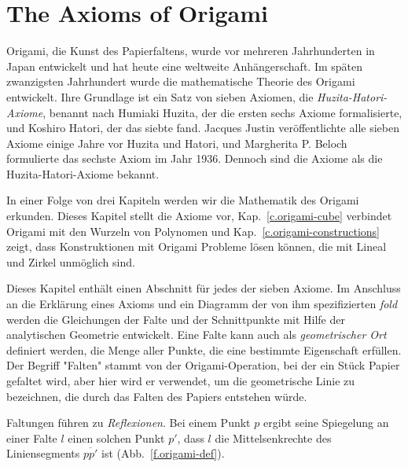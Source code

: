
\chapter{The Axioms of Origami}\label{c.origami-axioms}


Origami, die Kunst des Papierfaltens, wurde vor mehreren Jahrhunderten in Japan entwickelt und hat heute eine weltweite Anhängerschaft. Im späten zwanzigsten Jahrhundert wurde die mathematische Theorie des Origami entwickelt. Ihre Grundlage ist ein Satz von sieben Axiomen, die 
\emph{Huzita-Hatori-Axiome}, benannt nach Humiaki Huzita, der die ersten sechs Axiome formalisierte, und Koshiro Hatori, der das siebte fand. Jacques Justin veröffentlichte alle sieben Axiome einige Jahre vor Huzita und Hatori, und Margherita P. Beloch formulierte das sechste Axiom im Jahr 1936. Dennoch sind die Axiome als die Huzita-Hatori-Axiome bekannt.

In einer Folge von drei Kapiteln werden wir die Mathematik des Origami erkunden. Dieses Kapitel stellt die Axiome vor, Kap.~\ref{c.origami-cube} verbindet Origami mit den Wurzeln von Polynomen und Kap.~\ref{c.origami-constructions} zeigt, dass Konstruktionen mit Origami Probleme lösen können, die mit Lineal und Zirkel unmöglich sind.
 
Dieses Kapitel enthält einen Abschnitt für jedes der sieben Axiome. Im Anschluss an die Erklärung eines Axioms und ein Diagramm der von ihm spezifizierten \emph{fold} werden die Gleichungen der Falte und der Schnittpunkte mit Hilfe der analytischen Geometrie entwickelt. Eine Falte kann auch als \emph{geometrischer Ort} definiert werden, die Menge aller Punkte, die eine bestimmte Eigenschaft erfüllen. Der Begriff "Falten" stammt von der Origami-Operation, bei der ein Stück Papier gefaltet wird, aber hier wird er verwendet, um die geometrische Linie zu bezeichnen, die durch das Falten des Papiers entstehen würde.

Faltungen führen zu \emph{Reflexionen}. Bei einem Punkt $p$ ergibt seine Spiegelung an einer Falte $l$ einen solchen Punkt $p'$, dass $l$ die Mittelsenkrechte des Liniensegments $\overline{pp'}$ ist (Abb.~\ref{f.origami-def}).


